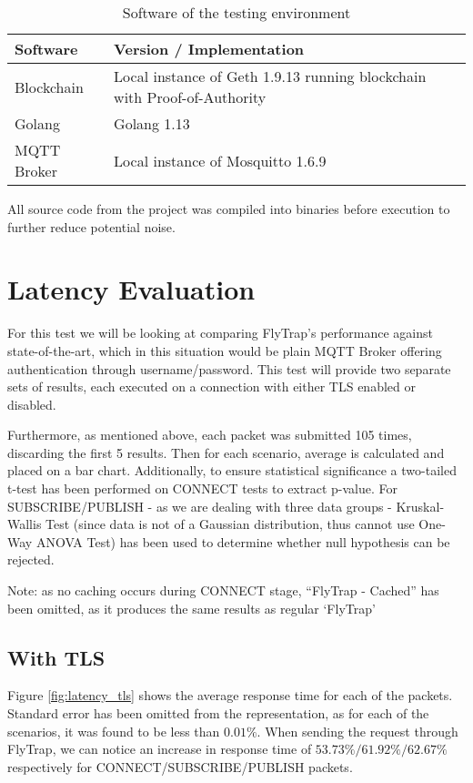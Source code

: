 \begin{table}[h]
\centering
\begin{tabular}{|l|l|}
\hline
\textbf{Software} & \textbf{Version / Implementation}                                        \\ \hline
Blockchain        & Local instance of Geth 1.9.13 running blockchain with Proof-of-Authority \\ \hline
Golang            & Golang 1.13                                                              \\ \hline
MQTT Broker       & Local instance of Mosquitto 1.6.9                                        \\ \hline
\end{tabular}
\caption{Software of the testing environment}
\label{tab:sw}
\end{table}

All source code from the project was compiled into binaries before execution to further reduce potential noise.

\section{Latency Evaluation}
For this test we will be looking at comparing FlyTrap's performance against state-of-the-art, which in this situation would be plain MQTT Broker offering authentication through username/password. This test will provide two separate sets of results, each executed on a connection with either TLS enabled or disabled.

Furthermore, as mentioned above, each packet was submitted 105 times, discarding the first 5 results. Then for each scenario, average is calculated and placed on a bar chart. Additionally, to ensure statistical significance a two-tailed t-test has been performed on CONNECT tests to extract p-value. For SUBSCRIBE/PUBLISH - as we are dealing with three data groups - Kruskal-Wallis Test (since data is not of a Gaussian distribution, thus cannot use One-Way ANOVA Test) has been used to determine whether null hypothesis can be rejected.

Note: as no caching occurs during CONNECT stage, ``FlyTrap - Cached'' has been omitted, as it produces the same results as regular `FlyTrap'

\subsection{With TLS}
Figure \ref{fig:latency_tls} shows the average response time for each of the packets. Standard error has been omitted from the representation, as for each of the scenarios, it was found to be less than $0.01\%$. When sending the request through FlyTrap, we can notice an increase in response time of $53.73\%/61.92\%/62.67\%$ respectively for CONNECT/SUBSCRIBE/PUBLISH packets.

